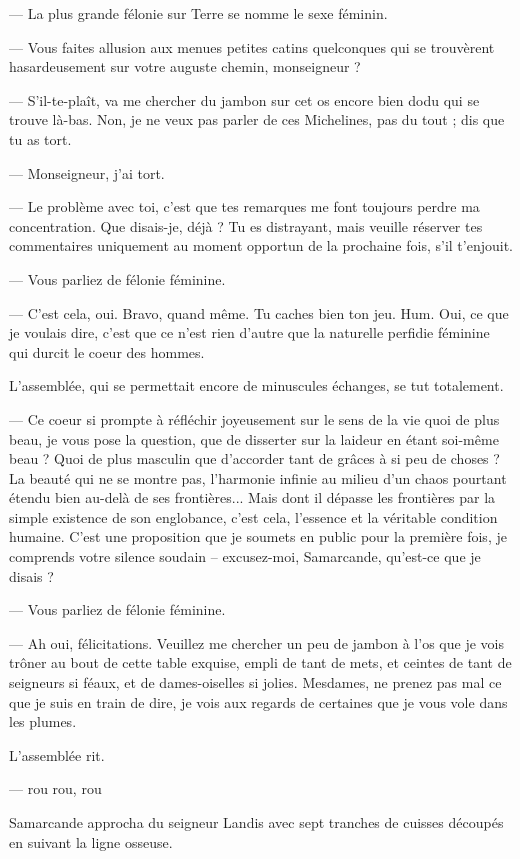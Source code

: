 --- La plus grande félonie sur Terre se nomme le sexe féminin.

--- Vous faites allusion aux menues petites catins quelconques qui
se trouvèrent hasardeusement sur votre auguste chemin, monseigneur ?

--- S'il-te-plaît, va me chercher du jambon sur cet os encore bien
dodu qui se trouve là-bas. Non, je ne veux pas parler de ces
Michelines, pas du tout ; dis que tu as tort.

--- Monseigneur, j'ai tort.

--- Le problème avec toi, c'est que tes remarques me font toujours
perdre ma concentration. Que disais-je, déjà ? Tu es distrayant, mais
veuille réserver tes commentaires uniquement au moment opportun de la
prochaine fois, s'il t'enjouit.

--- Vous parliez de félonie féminine.

--- C'est cela, oui. Bravo, quand même. Tu caches bien ton
jeu. Hum. Oui, ce que je voulais dire, c'est que ce n'est rien d'autre
que la naturelle perfidie féminine qui durcit le coeur des hommes.

L'assemblée, qui se permettait encore de minuscules échanges, se tut
totalement.

--- Ce coeur si prompte à réfléchir joyeusement sur le sens de la vie
quoi de plus beau, je vous pose la question, que de disserter sur la
laideur en étant soi-même beau ?  Quoi de plus masculin que d'accorder
tant de grâces à si peu de choses ? La beauté qui ne se montre pas,
l'harmonie infinie au milieu d'un chaos pourtant étendu bien au-delà
de ses frontières... Mais dont il dépasse les frontières par la simple
existence de son englobance, c'est cela, l'essence et la véritable
condition humaine. C'est une proposition que je soumets en public pour
la première fois, je comprends votre silence soudain -- excusez-moi,
Samarcande, qu'est-ce que je disais ?

--- Vous parliez de félonie féminine.

--- Ah oui, félicitations. Veuillez me chercher un peu de jambon à
l'os que je vois trôner au bout de cette table exquise, empli de tant
de mets, et ceintes de tant de seigneurs si féaux, et de dames-oiselles si
jolies. Mesdames, ne prenez pas mal ce que je suis en train de dire,
je vois aux regards de certaines que je vous vole dans les plumes.

L'assemblée rit.

--- rou rou, rou

Samarcande approcha du seigneur Landis avec sept tranches de cuisses
découpés en suivant la ligne osseuse.
